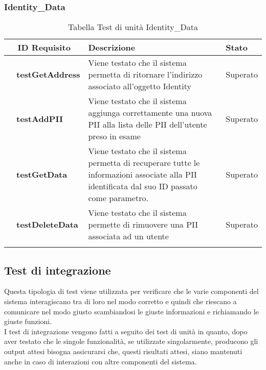 \subsubsection{Identity\_Data}
\begin{longtable}{|r l|p{10cm}|p{2cm}|}
	\hline
	\multicolumn{2}{|c|}{\textbf{ID Requisito}} & \textbf{Descrizione} & \textbf{Stato}\tabularnewline
	\hline
	&\textbf{testGetAddress}&Viene testato che il sistema permetta di ritornare l'indirizzo associato all'oggetto Identity& Superato\\\hline
	&\textbf{testAddPII}&Viene testato che il sistema aggiunga correttamente una nuova \gls{PII} alla lista delle \gls{PII} dell'utente preso in esame& Superato\\\hline
	&\textbf{testGetData}&Viene testato che il sistema permetta di recuperare tutte le informazioni associate alla \gls{PII} identificata dal suo ID passato come parametro.& Superato\\\hline
	&\textbf{testDeleteData}&Viene testato che il sistema permette di rimuovere una \gls{PII} associata ad un utente& Superato\\\hline
	\caption{Tabella Test di unità Identity\_Data}
\end{longtable}
\subsection{Test di integrazione}
Questa tipologia di test viene utilizzata per verificare che le varie componenti del sistema interagiscano tra di loro nel modo corretto e quindi che riescano a comunicare nel modo giusto scambiandosi le giuste informazioni e richiamando le giuste funzioni.\\
I test di integrazione vengono fatti a seguito dei test di unità in quanto, dopo aver testato che le singole funzionalità, se utilizzate singolarmente, producono gli output attesi bisogna assicurarsi che, questi risultati attesi, siano mantenuti anche in caso di interazioni con altre componenti del sistema.
